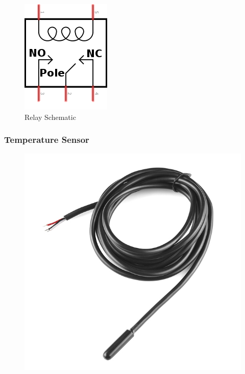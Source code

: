 \documentclass[10pt]{beamer}
\begin{document}
{\begin{frame}
\begin{figure}
\begin{minipage}[b]{0.4\linewidth}
				\includegraphics[width = 0.8\linewidth]{images/relay_schem}
				\caption{Relay Schematic}
			\end{minipage}
		\end{figure}
	\end{frame}
{
	\begin{frame}
		\frametitle{Temperature Sensor}
		\begin{figure}[h!]
			\includegraphics[scale=1]{images/sensor}

\end{figure}
\end{frame}}}
\end{document}
